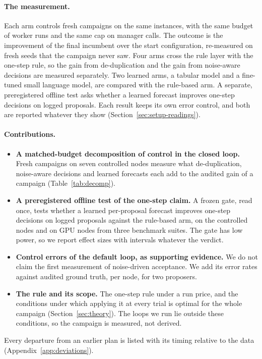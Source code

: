 \paragraph{The measurement.}
Each arm controls fresh campaigns on the same instances, with the same budget of worker runs and the same cap on manager calls. The outcome is the improvement of the final incumbent over the start configuration, re-measured on fresh seeds that the campaign never saw. Four arms cross the rule layer with the one-step rule, so the gain from de-duplication and the gain from noise-aware decisions are measured separately. Two learned arms, a tabular model and a fine-tuned small language model, are compared with the rule-based arm. A separate, preregistered offline test asks whether a learned forecast improves one-step decisions on logged proposals. Each result keeps its own error control, and both are reported whatever they show (Section~\ref{sec:setup-readings}).

\paragraph{Contributions.}
\begin{itemize}
\item \textbf{A matched-budget decomposition of control in the closed loop.} Fresh campaigns on seven controlled nodes measure what de-duplication, noise-aware decisions and learned forecasts each add to the audited gain of a campaign (Table~\ref{tab:decomp}). \LoopHeadline
\item \textbf{A preregistered offline test of the one-step claim.} A frozen gate, read once, tests whether a learned per-proposal forecast improves one-step decisions on logged proposals against the rule-based arm, on the controlled nodes and on GPU nodes from three benchmark suites. The gate has low power, so we report effect sizes with intervals whatever the verdict. 
\item \textbf{Control errors of the default loop, as supporting evidence.} We do not claim the first measurement of noise-driven acceptance. We add its error rates against audited ground truth, per node, for two proposers. \COneHeadline
\item \textbf{The rule and its scope.} The one-step rule under a run price, and the conditions under which applying it at every trial is optimal for the whole campaign (Section~\ref{sec:theory}). The loops we run lie outside these conditions, so the campaign is measured, not derived. 
\end{itemize}
Every departure from an earlier plan is listed with its timing relative to the data (Appendix~\ref{app:deviations}).

